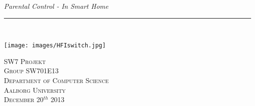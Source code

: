 
\thispagestyle{empty}
\begin{flushright}
\vspace{3cm}

\phantom{hul}

\phantom{hul}

\phantom{hul}

\textsl{\Huge Parental Control - In Smart Home} \\ \vspace{1cm}

\rule{13cm}{3mm} \\ \vspace{1.5cm}
\vspace{1cm}

\texttt{[image: images/HFIswitch.jpg]}


\vspace{1.5cm} 
\textsc{\Large SW7 Projekt \\
Group SW701E13 \\
Department of Computer Science\\
Aalborg University\\
December 20$^{th}$ 2013\\}
\end{flushright}
